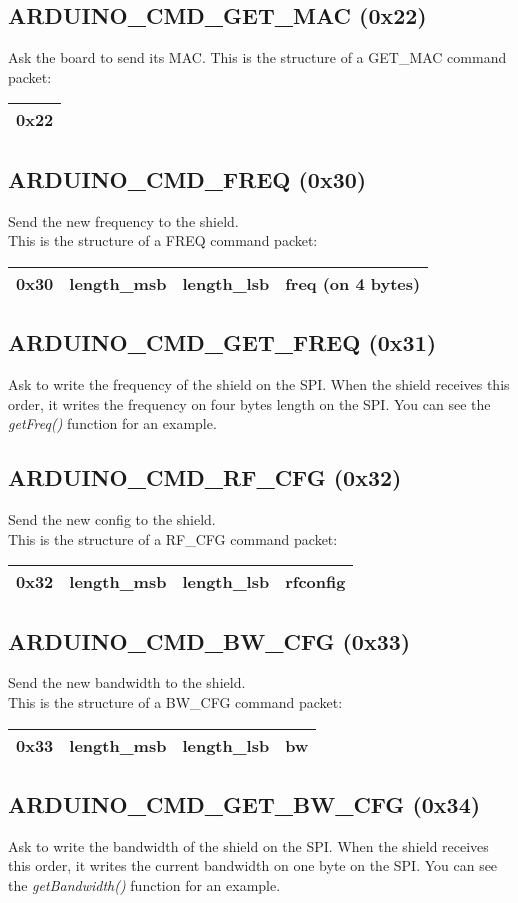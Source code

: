 \documentclass{article}
\begin{document}
\subsection{ARDUINO\_CMD\_GET\_MAC (0x22)}
Ask the board to send its MAC.
This is the structure of a GET\_MAC command packet:
\begin{tabular}{|c|}
\hline
0x22\\
\hline
\end{tabular}
\subsection{ARDUINO\_CMD\_FREQ (0x30)}
Send the new frequency to the shield.\\
This is the structure of a FREQ command packet:
\begin{tabular}{|c|c|c|c|}
\hline
0x30 & length\_msb & length\_lsb & freq (on 4 bytes)\\
\hline
\end{tabular}
\subsection{ARDUINO\_CMD\_GET\_FREQ (0x31)}
Ask to write the frequency of the shield on the SPI. When the shield receives this order, it writes the frequency on four bytes length on the SPI. You can see the \emph{getFreq()} function for an example.
\subsection{ARDUINO\_CMD\_RF\_CFG (0x32)}
Send the new config to the shield.\\
This is the structure of a RF\_CFG command packet:
\begin{tabular}{|c|c|c|c|}
\hline
0x32 & length\_msb & length\_lsb & rfconfig\\
\hline
\end{tabular}
\subsection{ARDUINO\_CMD\_BW\_CFG (0x33)}
Send the new bandwidth to the shield.\\
This is the structure of a BW\_CFG command packet:
\begin{tabular}{|c|c|c|c|}
\hline
0x33 & length\_msb & length\_lsb & bw\\
\hline
\end{tabular}
\subsection{ARDUINO\_CMD\_GET\_BW\_CFG (0x34)}
Ask to write the bandwidth of the shield on the SPI. When the shield receives this order, it writes the current bandwidth on one byte on the SPI. You can see the \emph{getBandwidth()} function for an example.
\end{document}
